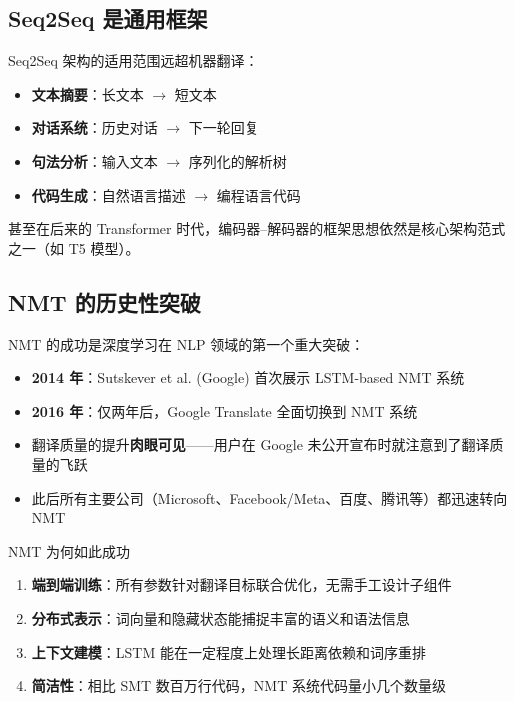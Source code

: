 \documentclass[a4paper]{article}
\begin{document}
\subsection{Seq2Seq 是通用框架}





Seq2Seq 架构的适用范围远超机器翻译：

\begin{itemize}
    \item \textbf{文本摘要}：长文本 $\rightarrow$ 短文本
    \item \textbf{对话系统}：历史对话 $\rightarrow$ 下一轮回复
    \item \textbf{句法分析}：输入文本 $\rightarrow$ 序列化的解析树
    \item \textbf{代码生成}：自然语言描述 $\rightarrow$ 编程语言代码
\end{itemize}

甚至在后来的 Transformer 时代，编码器--解码器的框架思想依然是核心架构范式之一（如 T5 模型）。

\subsection{NMT 的历史性突破}





NMT 的成功是深度学习在 NLP 领域的第一个重大突破：

\begin{itemize}
    \item \textbf{2014 年}：Sutskever et al. (Google) 首次展示 LSTM-based NMT 系统
    \item \textbf{2016 年}：仅两年后，Google Translate 全面切换到 NMT 系统
    \item 翻译质量的提升\textbf{肉眼可见}——用户在 Google 未公开宣布时就注意到了翻译质量的飞跃
    \item 此后所有主要公司（Microsoft、Facebook/Meta、百度、腾讯等）都迅速转向 NMT
\end{itemize}

\begin{importantbox}{NMT 为何如此成功}
\begin{enumerate}
    \item \textbf{端到端训练}：所有参数针对翻译目标联合优化，无需手工设计子组件
    \item \textbf{分布式表示}：词向量和隐藏状态能捕捉丰富的语义和语法信息
    \item \textbf{上下文建模}：LSTM 能在一定程度上处理长距离依赖和词序重排
    \item \textbf{简洁性}：相比 SMT 数百万行代码，NMT 系统代码量小几个数量级
\end{enumerate}
\end{importantbox}
\end{document}
